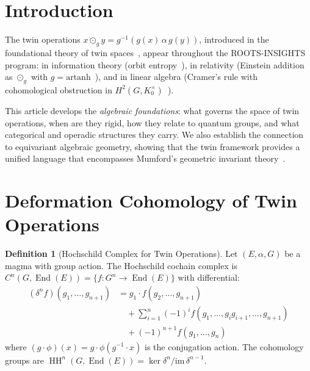 \documentclass[11pt,twocolumn]{article}
\theoremstyle{plain}\newtheorem{theorem}{Theorem}\newtheorem{proposition}[theorem]{Proposition}\newtheorem{corollary}[theorem]{Corollary}\newtheorem{lemma}[theorem]{Lemma}
\theoremstyle{definition}\newtheorem{definition}[theorem]{Definition}\newtheorem{example}[theorem]{Example}
\theoremstyle{remark}\newtheorem{remark}[theorem]{Remark}
\newcommand{\HH}{\operatorname{HH}}
\newcommand{\End}{\operatorname{End}}
\begin{document}
\section{Introduction}

The twin operations $x \odot_g y = g^{-1}(g(x) \,\alpha\, g(y))$, introduced in the foundational theory of twin spaces~\cite{nembe2026vol1,nembe2026vol3}, appear throughout the ROOTS-INSIGHTS program: in information theory (orbit entropy~\cite{nembe2026vol16}), in relativity (Einstein addition as $\odot_g$ with $g = \mathrm{artanh}$~\cite{nembe2026vol17}), and in linear algebra (Cramer's rule with cohomological obstruction in $H^2(G, K_0^\times)$~\cite{nembe2026cramer}).

This article develops the \emph{algebraic foundations}: what governs the space of twin operations, when are they rigid, how they relate to quantum groups, and what categorical and operadic structures they carry. We also establish the connection to equivariant algebraic geometry, showing that the twin framework provides a unified language that encompasses Mumford's geometric invariant theory~\cite{mumford1965}.


\section{Deformation Cohomology of Twin Operations}
\label{sec:cohomology}

\begin{definition}[Hochschild Complex for Twin Operations]\label{def:hochschild}
Let $(E, \alpha, G)$ be a magma with group action. The Hochschild cochain complex is $C^n(G, \End(E)) = \{f: G^n \to \End(E)\}$ with differential:
\begin{align*}
(\delta^n f)(g_1, \ldots, g_{n+1}) &= g_1 \cdot f(g_2, \ldots, g_{n+1}) \\
&\quad + \sum_{i=1}^n (-1)^i f(g_1, \ldots, g_i g_{i+1}, \ldots, g_{n+1}) \\
&\quad + (-1)^{n+1} f(g_1, \ldots, g_n)
\end{align*}
where $(g \cdot \phi)(x) = g \cdot \phi(g^{-1} \cdot x)$ is the conjugation action. The cohomology groups are $\HH^n(G, \End(E)) = \ker\delta^n / \mathrm{im}\,\delta^{n-1}$.
\end{definition}
\end{document}
